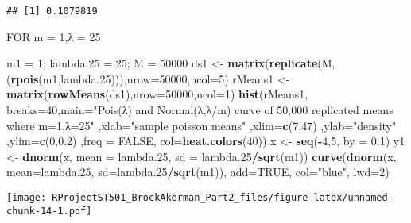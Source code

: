 \documentclass[
]{article}
\newenvironment{Shaded}{\begin{snugshade}}{\end{snugshade}}
\newcommand{\DataTypeTok}[1]{\textcolor[rgb]{0.13,0.29,0.53}{#1}}
\newcommand{\DecValTok}[1]{\textcolor[rgb]{0.00,0.00,0.81}{#1}}
\newcommand{\FloatTok}[1]{\textcolor[rgb]{0.00,0.00,0.81}{#1}}
\newcommand{\KeywordTok}[1]{\textcolor[rgb]{0.13,0.29,0.53}{\textbf{#1}}}
\newcommand{\NormalTok}[1]{#1}
\newcommand{\OperatorTok}[1]{\textcolor[rgb]{0.81,0.36,0.00}{\textbf{#1}}}
\newcommand{\OtherTok}[1]{\textcolor[rgb]{0.56,0.35,0.01}{#1}}
\newcommand{\StringTok}[1]{\textcolor[rgb]{0.31,0.60,0.02}{#1}}
\begin{document}
\begin{verbatim}
## [1] 0.1079819
\end{verbatim}

FOR m = 1,λ = 25

\begin{Shaded}
\begin{Highlighting}[]
\NormalTok{m1 =}\StringTok{ }\DecValTok{1}\NormalTok{; lambda}\FloatTok{.25}\NormalTok{ =}\StringTok{ }\DecValTok{25}\NormalTok{; M =}\StringTok{ }\DecValTok{50000}
\NormalTok{ds1 <-}\StringTok{ }\KeywordTok{matrix}\NormalTok{(}\KeywordTok{replicate}\NormalTok{(M,(}\KeywordTok{rpois}\NormalTok{(m1,lambda}\FloatTok{.25}\NormalTok{))),}\DataTypeTok{nrow=}\DecValTok{50000}\NormalTok{,}\DataTypeTok{ncol=}\DecValTok{5}\NormalTok{)}
\NormalTok{rMeans1 <-}\StringTok{ }\KeywordTok{matrix}\NormalTok{(}\KeywordTok{rowMeans}\NormalTok{(ds1),}\DataTypeTok{nrow=}\DecValTok{50000}\NormalTok{,}\DataTypeTok{ncol=}\DecValTok{1}\NormalTok{)}
\KeywordTok{hist}\NormalTok{(rMeans1, }\DataTypeTok{breaks=}\DecValTok{40}\NormalTok{,}\DataTypeTok{main=}\StringTok{"Pois(λ) and Normal(λ,λ/m) curve of 50,000 replicated means where m=1,λ=25"}\NormalTok{ ,}\DataTypeTok{xlab=}\StringTok{"sample poisson means"}\NormalTok{ ,}\DataTypeTok{xlim=}\KeywordTok{c}\NormalTok{(}\DecValTok{7}\NormalTok{,}\DecValTok{47}\NormalTok{) ,}\DataTypeTok{ylab=}\StringTok{"density"}\NormalTok{ ,}\DataTypeTok{ylim=}\KeywordTok{c}\NormalTok{(}\DecValTok{0}\NormalTok{,}\FloatTok{0.2}\NormalTok{) ,}\DataTypeTok{freq =} \OtherTok{FALSE}\NormalTok{, }\DataTypeTok{col=}\KeywordTok{heat.colors}\NormalTok{(}\DecValTok{40}\NormalTok{))}
\NormalTok{x <-}\StringTok{ }\KeywordTok{seq}\NormalTok{(}\OperatorTok{-}\DecValTok{4}\NormalTok{,}\DecValTok{5}\NormalTok{, }\DataTypeTok{by =} \FloatTok{0.1}\NormalTok{)}
\NormalTok{y1 <-}\StringTok{ }\KeywordTok{dnorm}\NormalTok{(x, }\DataTypeTok{mean =}\NormalTok{ lambda}\FloatTok{.25}\NormalTok{, }\DataTypeTok{sd =}\NormalTok{ lambda}\FloatTok{.25}\OperatorTok{/}\KeywordTok{sqrt}\NormalTok{(m1))}
\KeywordTok{curve}\NormalTok{(}\KeywordTok{dnorm}\NormalTok{(x, }\DataTypeTok{mean=}\NormalTok{lambda}\FloatTok{.25}\NormalTok{, }\DataTypeTok{sd=}\NormalTok{lambda}\FloatTok{.25}\OperatorTok{/}\KeywordTok{sqrt}\NormalTok{(m1)), }\DataTypeTok{add=}\OtherTok{TRUE}\NormalTok{, }\DataTypeTok{col=}\StringTok{"blue"}\NormalTok{, }\DataTypeTok{lwd=}\DecValTok{2}\NormalTok{)}
\end{Highlighting}
\end{Shaded}

\texttt{[image: RProjectST501\_BrockAkerman\_Part2\_files/figure-latex/unnamed-chunk-14-1.pdf]}
\end{document}
